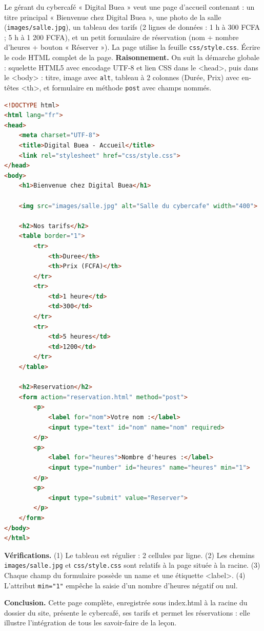 \documentclass[11pt]{article}
\newcommand{\cle}[1]{{\popxbold\color{popdark}#1}}
\begin{document}
\begin{exoresolu}
Le gérant du cybercafé « Digital Buea » veut une page d'accueil contenant : un titre principal « Bienvenue chez Digital Buea », une photo de la salle (\texttt{images/salle.jpg}), un tableau des tarifs (2 lignes de données : 1 h à 300 FCFA ; 5 h à 1 200 FCFA), et un petit formulaire de réservation (nom + nombre d'heures + bouton « Réserver »). La page utilise la feuille \texttt{css/style.css}. Écrire le code HTML complet de la page.
\tcblower
\textbf{Raisonnement.} On suit la démarche globale : squelette HTML5 avec encodage UTF-8 et lien CSS dans le \cle{<head>}, puis dans le \cle{<body>} : titre, image avec \texttt{alt}, tableau à 2 colonnes (Durée, Prix) avec en-têtes \cle{<th>}, et formulaire en méthode \texttt{post} avec champs nommés.
\begin{lstlisting}[language=HTML]
<!DOCTYPE html>
<html lang="fr">
<head>
    <meta charset="UTF-8">
    <title>Digital Buea - Accueil</title>
    <link rel="stylesheet" href="css/style.css">
</head>
<body>
    <h1>Bienvenue chez Digital Buea</h1>

    <img src="images/salle.jpg" alt="Salle du cybercafe" width="400">

    <h2>Nos tarifs</h2>
    <table border="1">
        <tr>
            <th>Duree</th>
            <th>Prix (FCFA)</th>
        </tr>
        <tr>
            <td>1 heure</td>
            <td>300</td>
        </tr>
        <tr>
            <td>5 heures</td>
            <td>1200</td>
        </tr>
    </table>

    <h2>Reservation</h2>
    <form action="reservation.html" method="post">
        <p>
            <label for="nom">Votre nom :</label>
            <input type="text" id="nom" name="nom" required>
        </p>
        <p>
            <label for="heures">Nombre d'heures :</label>
            <input type="number" id="heures" name="heures" min="1">
        </p>
        <p>
            <input type="submit" value="Reserver">
        </p>
    </form>
</body>
</html>
\end{lstlisting}
\textbf{Vérifications.} (1) Le tableau est régulier : 2 cellules par ligne. (2) Les chemins \texttt{images/salle.jpg} et \texttt{css/style.css} sont relatifs à la page située à la racine. (3) Chaque champ du formulaire possède un \cle{name} et une étiquette \cle{<label>}. (4) L'attribut \texttt{min="1"} empêche la saisie d'un nombre d'heures négatif ou nul.

\textbf{Conclusion.} Cette page complète, enregistrée sous \cle{index.html} à la racine du dossier du site, présente le cybercafé, ses tarifs et permet les réservations : elle illustre l'intégration de tous les savoir-faire de la leçon.
\end{exoresolu}
\end{document}
